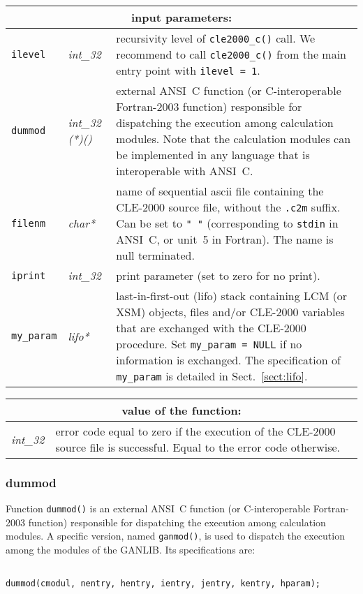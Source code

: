 \noindent
\begin{tabular}{|p{1.5cm}|p{2cm}|p{11cm}|}
\hline
\multicolumn{3}{|c|}{\bf input parameters:} \\
\hline
{\tt ilevel} & {\it int\_32} & recursivity level of {\tt cle2000\_c()} call. We recommend to call
{\tt cle2000\_c()} from the main entry point with {\tt ilevel = 1}. \\
\hline
{\tt dummod} & {\it int\_32 (*)()} & external ANSI~C function (or C-interoperable Fortran-2003 function) responsible for dispatching the execution among calculation modules. Note that the calculation modules can be implemented in any language that is interoperable with ANSI~C. \\
\hline
{\tt filenm} & {\it char*} & name of sequential {\sc ascii} file containing the CLE-2000 source file, without the {\tt .c2m} suffix. Can be set to {\tt " "} (corresponding to {\tt stdin} in ANSI~C, or unit~5 in Fortran). The name is null terminated. \\
\hline
{\tt iprint} & {\it int\_32} & print parameter (set to zero for no print). \\
\hline
{\tt my\_param} & {\it lifo*} & last-in-first-out (lifo) stack containing LCM (or XSM) objects, files and/or CLE-2000 variables that are exchanged with the CLE-2000 procedure. Set {\tt my\_param = NULL} if  no information is exchanged. The specification of {\tt my\_param} is detailed in Sect.~\ref{sect:lifo}. \\
\hline
\end{tabular}

\vskip 0.4cm

\noindent
\begin{tabular}{|p{4.0cm}|p{11cm}|}
\hline
\multicolumn{2}{|c|}{\bf value of the function:} \\
\hline
{\it int\_32} & error code equal to zero if the execution of the CLE-2000 source file is successful. Equal to the error code otherwise. \\
\hline
\end{tabular}

\subsubsection{dummod}

Function {\tt dummod()} is an external ANSI~C function (or C-interoperable Fortran-2003 function) responsible for dispatching the execution among calculation modules.
A specific version, named {\tt ganmod()}, is used to dispatch the execution among the modules of the GANLIB. Its specifications are:
\begin{verbatim}

dummod(cmodul, nentry, hentry, ientry, jentry, kentry, hparam);
\end{verbatim}

